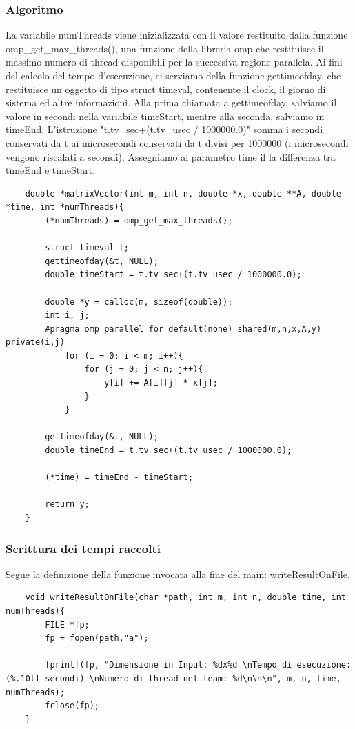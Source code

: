 \subsubsection{Algoritmo}
La variabile numThreads viene inizializzata con il valore restituito dalla funzione omp_get_max_threads(), una funzione della libreria omp che restituisce il massimo numero di thread disponibili per la successiva regione parallela.
Ai fini del calcolo del tempo d'esecuzione, ci serviamo della funzione gettimeofday, che restituisce un oggetto di tipo struct timeval, contenente il clock, il giorno di sistema ed altre informazioni.
Alla prima chiamata a gettimeofday, salviamo il valore in secondi nella variabile timeStart, mentre alla seconda, salviamo in timeEnd.
L'istruzione "t.tv_sec+(t.tv_usec / 1000000.0)" somma i secondi conservati da t ai microsecondi conservati da t divisi per 1000000 (i microsecondi vengono riscalati a secondi).
Assegniamo al parametro time il la differenza tra timeEnd e timeStart.
\begin{lstlisting}
    double *matrixVector(int m, int n, double *x, double **A, double *time, int *numThreads){
        (*numThreads) = omp_get_max_threads();
    
        struct timeval t;
        gettimeofday(&t, NULL);
        double timeStart = t.tv_sec+(t.tv_usec / 1000000.0);

        double *y = calloc(m, sizeof(double));
        int i, j;
        #pragma omp parallel for default(none) shared(m,n,x,A,y) private(i,j)
            for (i = 0; i < m; i++){
                for (j = 0; j < n; j++){
                    y[i] += A[i][j] * x[j];
                }
            }

        gettimeofday(&t, NULL);
        double timeEnd = t.tv_sec+(t.tv_usec / 1000000.0);

        (*time) = timeEnd - timeStart;

        return y;
    }
\end{lstlisting}

\subsubsection{Scrittura dei tempi raccolti}
Segue la definizione della funzione invocata alla fine del main: writeResultOnFile.
\begin{lstlisting}
    void writeResultOnFile(char *path, int m, int n, double time, int numThreads){
        FILE *fp;
        fp = fopen(path,"a");

        fprintf(fp, "Dimensione in Input: %dx%d \nTempo di esecuzione: (%.10lf secondi) \nNumero di thread nel team: %d\n\n\n", m, n, time, numThreads);
        fclose(fp);
    }
\end{lstlisting}

